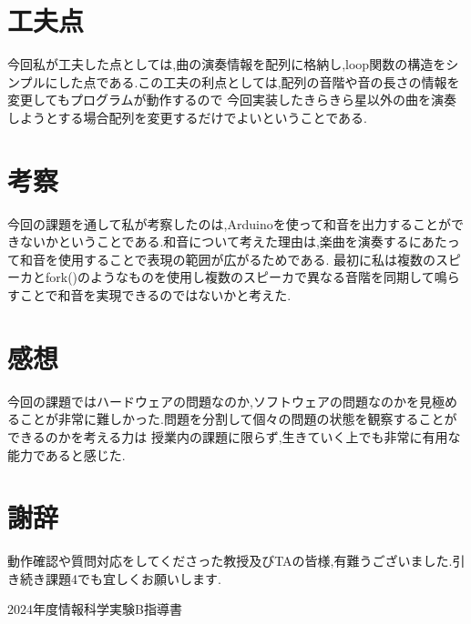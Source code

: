 \documentclass[dvipdfmx]{jarticle}
\begin{document}
\section{工夫点}
今回私が工夫した点としては,曲の演奏情報を配列に格納し,loop関数の構造をシンプルにした点である.この工夫の利点としては,配列の音階や音の長さの情報を変更してもプログラムが動作するので
今回実装したきらきら星以外の曲を演奏しようとする場合配列を変更するだけでよいということである.
\section{考察}
今回の課題を通して私が考察したのは,Arduinoを使って和音を出力することができないかということである.和音について考えた理由は,楽曲を演奏するにあたって和音を使用することで表現の範囲が広がるためである.
最初に私は複数のスピーカとfork()のようなものを使用し複数のスピーカで異なる音階を同期して鳴らすことで和音を実現できるのではないかと考えた.
\section{感想}
今回の課題ではハードウェアの問題なのか,ソフトウェアの問題なのかを見極めることが非常に難しかった.問題を分割して個々の問題の状態を観察することができるのかを考える力は
授業内の課題に限らず,生きていく上でも非常に有用な能力であると感じた.
\section{謝辞}
動作確認や質問対応をしてくださった教授及びTAの皆様,有難うございました.引き続き課題4でも宜しくお願いします.
\begin{thebibliography}{99}
     2024年度情報科学実験B指導書
\end{thebibliography}
\end{document}

